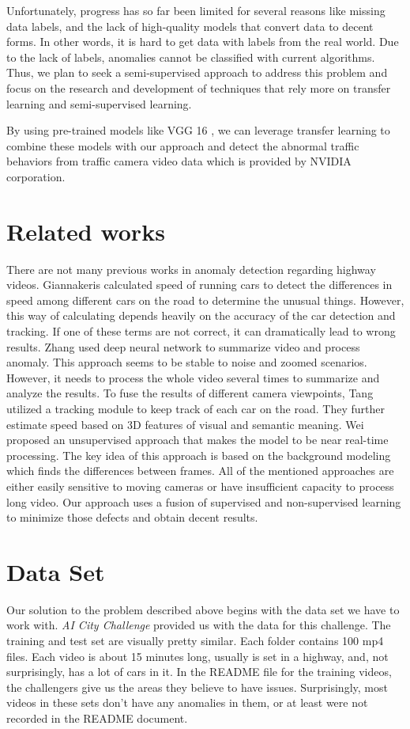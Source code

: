 \documentclass[10pt,twocolumn,letterpaper]{article}
\begin{document}
Unfortunately, progress has so far been limited for several reasons like missing data labels, and the lack of high-quality models that convert data to decent forms. In other words, it is hard to get data with labels from the real world. Due to the lack of labels, anomalies cannot be classified with current algorithms. Thus, we plan to seek a semi-supervised approach to address this problem and focus on the research and development of techniques that rely more on transfer learning and semi-supervised learning. 

By using pre-trained models like VGG 16 \cite{ren2015faster}, we can leverage transfer learning to combine these models with our approach and detect the abnormal traffic behaviors from traffic camera video data which is provided by NVIDIA corporation.

\section{Related works}
There are not many previous works in anomaly detection regarding highway videos. Giannakeris \etal \cite{giannakeris2018speed} calculated speed of running cars to detect the differences in speed among different cars on the road to determine the unusual things. However, this way of calculating depends heavily on the accuracy of the car detection and tracking. If one of these terms are not correct, it can dramatically lead to wrong results. Zhang \etal \cite{zhang2019deep} used deep neural network to summarize video and process anomaly. This approach seems to be stable to noise and zoomed scenarios. However, it needs to process the whole video several times to summarize and analyze the results. To fuse the results of different camera viewpoints, Tang \etal \cite{tang2018single} utilized a tracking module to keep track of each car on the road. They further estimate speed based on 3D features of visual and semantic meaning. Wei \etal \cite{wei2018unsupervised} proposed an unsupervised approach that makes the model to be near real-time processing. The key idea of this approach is based on the background modeling which finds the differences between frames. All of the mentioned approaches are either easily sensitive to moving cameras or have insufficient capacity to process long video. Our approach uses a fusion of supervised and non-supervised learning to minimize those defects and obtain decent results.

\section{Data Set}
Our solution to the problem described above begins with the data set we have to work with. \textit{AI City Challenge} provided us with the data for this challenge. The training and test set are visually pretty similar. Each folder contains 100 mp4 files. Each video is about 15 minutes long, usually is set in a highway, and, not surprisingly, has a lot of cars in it. In the README file for the training videos, the challengers give us the areas they believe to have issues. Surprisingly, most videos in these sets don't have any anomalies in them, or at least were not recorded in the README document. 
\end{document}
